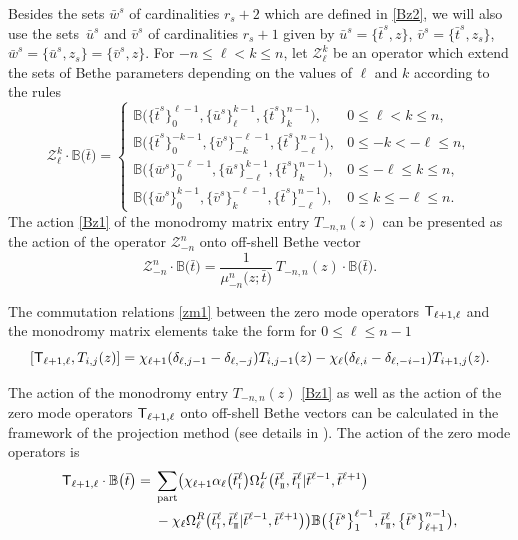 \documentclass[pdftex]{sigma}
\newcommand{\so}{\scriptscriptstyle \rm I}
\newcommand{\st}{\scriptscriptstyle \rm I\hspace{-1pt}I}
\newcommand{\bu}{\bar u}
\newcommand{\bv}{\bar v}
\newcommand{\bt}{{\bar t}}
\newcommand{\bw}{\bar w}
\theoremstyle{definition}
\def\BB{{\mathbb{B}}}
\def\r#1{\eqref{#1}}
\def\sT{{\sf T}}
\def\vk{\chi}
\def\Z{\mathcal{Z}}
\def\Oml{\Omega^L}
\def\Omr{\Omega^R}
\begin{document}
Besides the sets $\bw^s$ of cardinalities $r_s+2$ which are defined in \r{Bz2},
we will also use the sets~$\bu^s$ and $\bv^s$ of cardinalities $r_s+1$ given by
$
\bu^s=\bigl\{\bt^s,z\bigr\}$, $ \bv^s=\bigl\{\bt^s,z_s\bigr\}$, $ \bw^s=\bigl\{\bu^s,z_s\bigr\}=\bigl\{\bv^s,z\bigr\}$.
For $-n\leq \ell<k\leq n$, let $\Z_\ell^k$ be an operator which extend the sets of
 Bethe parameters depending on the values of $\ell$ and $k$ according to the
rules
\[%
\Z_\ell^k\cdot\BB\bigl(\bt\bigr)=\begin{cases}
\BB\bigl(\bigl\{\bt^s\bigr\}_0^{\ell-1},\bigl\{\bu^s\bigr\}_\ell^{k-1},\bigl\{\bt^s\bigr\}_k^{n-1}\bigr),&  0\leq \ell<k\leq n,\\[1mm]
\BB\bigl(\bigl\{\bt^s\bigr\}_0^{-k-1},\bigl\{\bv^s\bigr\}_{-k}^{-\ell-1},\bigl\{\bt^s\bigr\}_{-\ell}^{n-1}\bigr),&  0\leq -k<-\ell\leq n,\\[1mm]
\BB\bigl(\bigl\{\bw^s\bigr\}_0^{-\ell-1},\bigl\{\bu^s\bigr\}_{-\ell}^{k-1},\bigl\{\bt^s\bigr\}_{k}^{n-1}\bigr),& 0\leq -\ell\leq k\leq n,\\[1mm]
\BB\bigl(\bigl\{\bw^s\bigr\}_0^{k-1},\bigl\{\bv^s\bigr\}_{k}^{-\ell-1},\bigl\{\bt^s\bigr\}_{-\ell}^{n-1}\bigr),&  0\leq k\leq- \ell\leq n.
\end{cases}
\]
The action \r{Bz1} of the monodromy matrix entry $T_{-n,n}(z)$
 can be presented as the action
of the operator $\Z_{-n}^n$ onto off-shell Bethe vector
\begin{equation}\label{Bz6}
\Z_{-n}^n\cdot \BB\bigl(\bt\bigr)=
\frac{1}{\mu_{-n}^n\bigl(z;\bt\bigr)}\ T_{-n,n}(z)\cdot\BB\bigl(\bt\bigr) .
\end{equation}

The commutation relations \r{zm1} between the zero mode operators $\sT_{\ell+1,\ell}$ and the
monodromy matrix elements take the form for $0\leq \ell\leq n-1$
\begin{equation}\label{Bz0}
[\sT_{\ell+1,\ell} ,T_{i,j}(z)]=\vk_{\ell+1}
(\delta_{\ell,j-1}-\delta_{\ell,-j}) T_{i,j-1}(z)
-\vk_\ell(\delta_{\ell,i}-\delta_{\ell,-i-1}) T_{i+1,j}(z) .
\end{equation}

The action of the monodromy entry $T_{-n,n}(z)$ \r{Bz1}
as well as the action of the zero mode operators $\sT_{\ell+1,\ell}$
onto off-shell Bethe vectors can be calculated in the framework
 of the projection method (see details in \cite[Section~4.1]{LP2}).
The action of the zero mode operators is{\samepage
\begin{align}
\sT_{\ell+1,\ell}\cdot\BB\bigl(\bt\bigr)={}&\sum_{\rm part}\bigl(\vk_{\ell+1}
\alpha_\ell\bigl(\bt^\ell_{\so}\bigr) \Oml_\ell\bigl(\bt^\ell_{\st},\bt^\ell_{\so}|
\bt^{\ell-1},\bt^{\ell+1}\bigr)\nonumber\\
&- \vk_\ell \Omr_\ell\bigl(\bt^\ell_{\so},\bt^\ell_{\st}|\bt^{\ell-1},\bt^{\ell+1}\bigr)\bigr)
\BB\bigl(\bigl\{\bt^s\bigr\}_1^{\ell-1},\bt^\ell_{\st},\bigl\{\bt^s\bigr\}_{\ell+1}^{n-1}\bigr) ,\label{Bz8}
\end{align}}%
\end{document}
